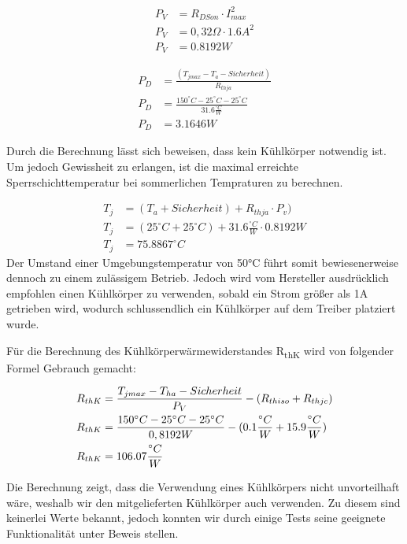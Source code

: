 \begin{align*}
    P_V &= R_{DSon} \cdot I_{max}^2 \\
    P_V &= 0,32\Omega \cdot 1.6A^2 \\
    P_V &= 0.8192W
\end{align*}

\begin{align*}
    P_D &= \frac{(T_{jmax} - T_{a} - Sicherheit)}{R_{thja}} \\
    P_D &= \frac{150^{\circ}C - 25^{\circ}C - 25^{\circ}C}{31.6\frac{{}^{\circ}C}{W}} \\
    P_D &= 3.1646W
\end{align*}

Durch die Berechnung lässt sich beweisen, dass kein Kühlkörper notwendig ist.
Um jedoch Gewissheit zu erlangen, ist die maximal erreichte Sperrschichttemperatur bei sommerlichen Tempraturen zu berechnen.

\begin{align*}
    T_{j} &= (T_{a}+Sicherheit) + {R_{thja}} \cdot P_{v}) \\
    T_{j} &= (25^{\circ}C + 25^{\circ}C) + 31.6\frac{{}^{\circ}C}{W} \cdot 0.8192W \\
    T_{j} &= 75.8867^{\circ}C
\end{align*}
\newpage
Der Umstand einer Umgebungstemperatur von 50°C führt somit bewiesenerweise dennoch zu einem zulässigem Betrieb.
Jedoch wird vom Hersteller ausdrücklich empfohlen einen Kühlkörper zu verwenden, sobald ein Strom größer als 1A getrieben wird, wodurch schlussendlich ein Kühlkörper auf dem Treiber platziert wurde.

Für die Berechnung des Kühlkörperwärmewiderstandes R\textsubscript{thK} wird von folgender Formel Gebrauch gemacht:

\begin{align}
    R_{thK} &= \frac{T_{jmax} - T_{ha} - Sicherheit}{P_V} - (R_{thiso} + R_{thjc}) \\
    R_{thK} &= \frac{150^{\circ}C - 25^{\circ}C - 25^{\circ}C}{0,8192W} - (0.1\frac{{}^{\circ}C}{W} + 15.9\frac{{}^{\circ}C}{W}) \notag \\
    R_{thK} &= 106.07\frac{{}^{\circ}C}{W}  \notag
\end{align}

Die Berechnung zeigt, dass die Verwendung eines Kühlkörpers nicht unvorteilhaft wäre, weshalb wir den mitgelieferten Kühlkörper auch verwenden.
Zu diesem sind keinerlei Werte bekannt, jedoch konnten wir durch einige Tests seine geeignete Funktionalität unter Beweis stellen.

